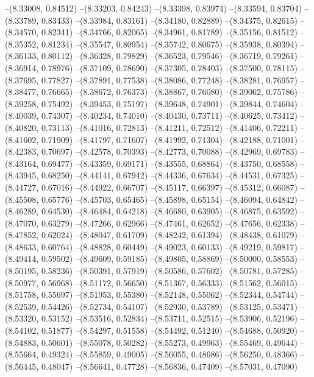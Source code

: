 --(8.33008, 0.84512)
--(8.33203, 0.84243)
--(8.33398, 0.83974)
--(8.33594, 0.83704)
--(8.33789, 0.83433)
--(8.33984, 0.83161)
--(8.34180, 0.82889)
--(8.34375, 0.82615)
--(8.34570, 0.82341)
--(8.34766, 0.82065)
--(8.34961, 0.81789)
--(8.35156, 0.81512)
--(8.35352, 0.81234)
--(8.35547, 0.80954)
--(8.35742, 0.80675)
--(8.35938, 0.80394)
--(8.36133, 0.80112)
--(8.36328, 0.79829)
--(8.36523, 0.79546)
--(8.36719, 0.79261)
--(8.36914, 0.78976)
--(8.37109, 0.78690)
--(8.37305, 0.78403)
--(8.37500, 0.78115)
--(8.37695, 0.77827)
--(8.37891, 0.77538)
--(8.38086, 0.77248)
--(8.38281, 0.76957)
--(8.38477, 0.76665)
--(8.38672, 0.76373)
--(8.38867, 0.76080)
--(8.39062, 0.75786)
--(8.39258, 0.75492)
--(8.39453, 0.75197)
--(8.39648, 0.74901)
--(8.39844, 0.74604)
--(8.40039, 0.74307)
--(8.40234, 0.74010)
--(8.40430, 0.73711)
--(8.40625, 0.73412)
--(8.40820, 0.73113)
--(8.41016, 0.72813)
--(8.41211, 0.72512)
--(8.41406, 0.72211)
--(8.41602, 0.71909)
--(8.41797, 0.71607)
--(8.41992, 0.71304)
--(8.42188, 0.71001)
--(8.42383, 0.70697)
--(8.42578, 0.70393)
--(8.42773, 0.70088)
--(8.42969, 0.69783)
--(8.43164, 0.69477)
--(8.43359, 0.69171)
--(8.43555, 0.68864)
--(8.43750, 0.68558)
--(8.43945, 0.68250)
--(8.44141, 0.67942)
--(8.44336, 0.67634)
--(8.44531, 0.67325)
--(8.44727, 0.67016)
--(8.44922, 0.66707)
--(8.45117, 0.66397)
--(8.45312, 0.66087)
--(8.45508, 0.65776)
--(8.45703, 0.65465)
--(8.45898, 0.65154)
--(8.46094, 0.64842)
--(8.46289, 0.64530)
--(8.46484, 0.64218)
--(8.46680, 0.63905)
--(8.46875, 0.63592)
--(8.47070, 0.63279)
--(8.47266, 0.62966)
--(8.47461, 0.62652)
--(8.47656, 0.62338)
--(8.47852, 0.62024)
--(8.48047, 0.61709)
--(8.48242, 0.61394)
--(8.48438, 0.61079)
--(8.48633, 0.60764)
--(8.48828, 0.60449)
--(8.49023, 0.60133)
--(8.49219, 0.59817)
--(8.49414, 0.59502)
--(8.49609, 0.59185)
--(8.49805, 0.58869)
--(8.50000, 0.58553)
--(8.50195, 0.58236)
--(8.50391, 0.57919)
--(8.50586, 0.57602)
--(8.50781, 0.57285)
--(8.50977, 0.56968)
--(8.51172, 0.56650)
--(8.51367, 0.56333)
--(8.51562, 0.56015)
--(8.51758, 0.55697)
--(8.51953, 0.55380)
--(8.52148, 0.55062)
--(8.52344, 0.54744)
--(8.52539, 0.54426)
--(8.52734, 0.54107)
--(8.52930, 0.53789)
--(8.53125, 0.53471)
--(8.53320, 0.53152)
--(8.53516, 0.52834)
--(8.53711, 0.52515)
--(8.53906, 0.52196)
--(8.54102, 0.51877)
--(8.54297, 0.51558)
--(8.54492, 0.51240)
--(8.54688, 0.50920)
--(8.54883, 0.50601)
--(8.55078, 0.50282)
--(8.55273, 0.49963)
--(8.55469, 0.49644)
--(8.55664, 0.49324)
--(8.55859, 0.49005)
--(8.56055, 0.48686)
--(8.56250, 0.48366)
--(8.56445, 0.48047)
--(8.56641, 0.47728)
--(8.56836, 0.47409)
--(8.57031, 0.47090)

